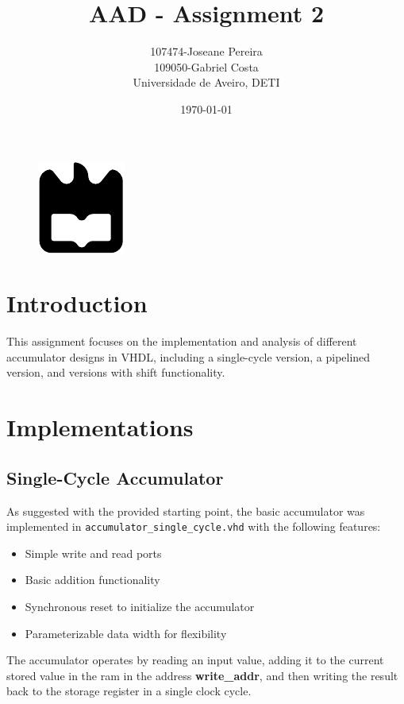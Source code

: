 \documentclass[a4paper,12pt]{article}
\title{AAD - Assignment 2}
\author{107474-Joseane Pereira \\
109050-Gabriel Costa \\
Universidade de Aveiro, DETI}
\date{\today}
\begin{document}
\begin{figure}
    \centering
    \includegraphics[width=0.3\linewidth]{ua.pdf}
    \label{fig:enter-label}
\end{figure}
\maketitle
\newpage
\tableofcontents
\newpage
\section{Introduction}
This assignment focuses on the implementation and analysis of different 
accumulator designs in VHDL, including a single-cycle version, a pipelined 
version, and versions with shift functionality.


\section{Implementations}

\subsection{Single-Cycle Accumulator}
As suggested with the provided starting point, the basic accumulator was implemented in
\texttt{accumulator\_single\_cycle.vhd} with the following features:
\begin{itemize}
    \item Simple write and read ports
    \item Basic addition functionality
    \item Synchronous reset to initialize the accumulator
    \item Parameterizable data width for flexibility
\end{itemize}

The accumulator operates by reading an input value, adding it to the current stored value in the ram in the address \textbf{write\_addr}, and then writing the result back to the storage register in a single clock cycle. 
\end{document}
